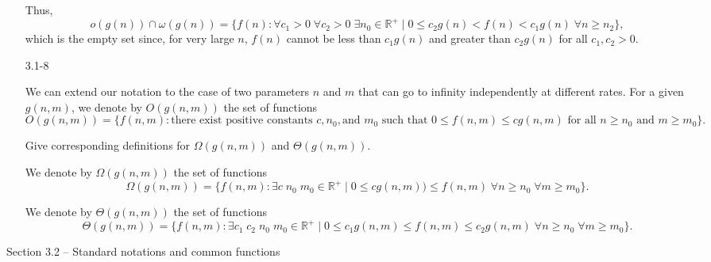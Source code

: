 \documentclass{report}
\makeatletter
\renewenvironment{framed}{%
 \def\FrameCommand##1{\hskip\@totalleftmargin
 \fboxsep=\FrameSep\fbox{##1}}%
 \MakeFramed {\advance\hsize-\width
   \@totalleftmargin\z@ \linewidth\hsize
   \@setminipage}}%
 {\par\unskip\endMakeFramed}
\DeclareMathOperator{\Exists}{\exists}
\DeclareMathOperator{\Forall}{\forall}
\makeatother
\begin{document}
\begin{enumerate}
\begin{framed}
Thus,
\[
o(g(n)) \cap \omega(g(n)) =
\{ f(n) : \Forall c_1 > 0\;\Forall c_2>0\;\Exists n_0\in\mathbb{R}^+\mid
   0 \le c_2g(n) < f(n) < c_1g(n)\;\Forall n \ge n_2 \},
\]
which is the empty set since, for very large $n$, $f(n)$ cannot be less than
$c_1 g(n)$ and greater than $c_2 g(n)$ for all $c_1, c_2 > 0$.

\end{framed}

\item[3.1{-}8]{We can extend our notation to the case of two parameters $n$ and
$m$ that can go to infinity independently at different rates. For a given
$g(n, m)$, we denote by $O(g(n, m))$ the set of functions
\[
O(g(n, m)) = \{{f(n, m) : \text{there exist positive constants } c, n_0,
\text{and\ } m_0 \text{\ such that\ } 0 \le f(n, m) \le c g(n, m)
\text{\ for all\ } n \ge n_0 \text{\ and\ } m \ge m_0}\}.
\]

Give corresponding definitions for $\Omega(g(n, m))$ and $\Theta(g(n, m))$.
}

\begin{framed}
We denote by $\Omega(g(n, m))$ the set of functions
\[
\Omega(g(n, m)) = \{f(n, m) : \Exists c\;n_0\;m_0 \in \mathbb{R}^+ \mid
                    0 \le cg(n, m)) \le f(n, m)\;
                    \Forall n \ge n_0\;\Forall m \ge m_0\}.
\]

We denote by $\Theta(g(n, m))$ the set of functions
\[
\Theta(g(n, m)) = \{f(n, m) : \Exists c_1\;c_2\;n_0\;m_0\in\mathbb{R}^+\mid
                    0 \le c_1g(n, m) \le f(n, m) \le c_2g(n, m)\;
                    \Forall n \ge n_0\;\Forall m \ge m_0\}.
\]
\end{framed}

\end{enumerate}

\newpage

{\large Section 3.2 {--} Standard notations and common functions}
\end{document}
